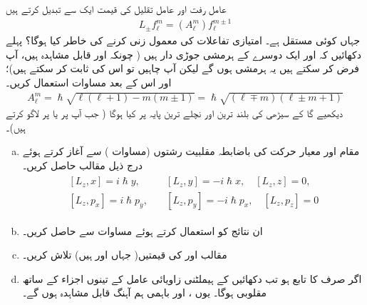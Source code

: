 عامل رفت اور عامل تقلیل  کی قیمت ایک  سے تبدیل کرتے ہیں 
\begin{align}\label{مساوات_تین_ابعاد_عامل_تقلیل_رفعت_اکائی_تبدیلی}
L_{\pm} f_{\ell}^m = (A_{\ell}^m) f_{\ell}^{m \pm 1}
\end{align}
جہاں  کوئی مستقل ہے۔  امتیازی تفاعلات کی معمول زنی کرنے کی خاطر  کیا ہوگا؟  پہلے دکھائیں کہ  اور  ایک دوسرے کے ہرمشی جوڑی دار ہیں ( چونکہ  اور  قابل مشاہدہ ہیں، آپ فرض کر سکتے ہیں یہ ہرمشی ہوں گے لیکن آپ چاہیں تو اس کی ثابت کر سکتے ہیں)؛ اور اس کے بعد مساوات  استعمال کریں۔  
\begin{align}\label{مساوات_تین_ابعادی_اے_ایل_ایم}
A_{\ell}^m = \hslash \sqrt{\ell (\ell +1) - m (m \pm 1)} = \hslash \sqrt{(\ell \mp m)(\ell \pm m + 1)} 
\end{align}
دیکھیے گا کے سیڑھی کی بلند ترین اور نچلے ترین پایہ پر کیا ہوگا ( جب آپ  پر  یا  پر  لاگو کرتے ہیں)۔ 
\begin{enumerate}[a.]
\item
مقام اور معیار حرکت کی باضابطہ مقلبیت رشتوں (مساوات ) سے آغاز کرتے ہوئے درج ذیل مقالب حاصل کریں۔
\begin{gather}
\begin{aligned}\label{مساوات_تین_ابعادی_مقلبی_رشتے}
[L_z , x] = i \hslash y, & \quad [L_z , y] = - i \hslash x, \quad [L_z , z] = 0, \\
 [L_z , p_x] = i \hslash p_y , &\quad [L_z , p_y] = - i \hslash p_x , \quad [L_z , p_z] = 0
\end{aligned}
\end{gather}
\item
ان نتائج کو استعمال کرتے ہوئے مساوات  سے  حاصل کریں۔
\item
مقالب  اور  کی قیمتیں( جہاں  اور  ہیں) تلاش کریں۔
\item
اگر  صرف  کا تابع ہو تب دکھائیں کے ہیملٹنی  زاویائی عامل  کے تینوں اجزاء کے ساتھ مقلوبی ہوگا۔ یوں ،  اور  باہمی ہم آہنگ قابل مشاہدہ ہوں گے۔
\end{enumerate}
